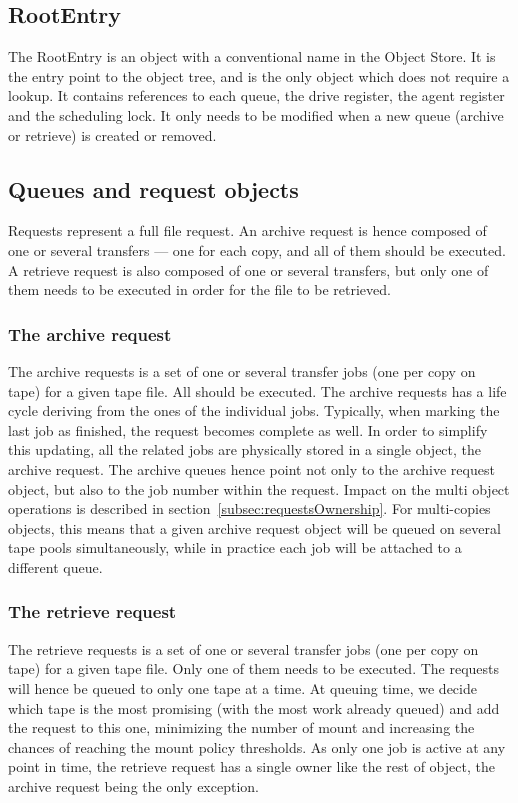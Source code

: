 \subsection{RootEntry}
The RootEntry is an object with a conventional name in the Object Store. It is the entry point to the object tree, and is the only object which does not require a lookup. It contains references to each queue, the drive register, the agent register and the scheduling lock. It only needs to be modified when a new queue (archive or retrieve) is created or removed.

\subsection{Queues and request objects}
Requests represent a full file request. An archive request is hence composed of one or several transfers --- one for each copy, and all of them should be executed. A retrieve request is also composed of one or several transfers, but only one of them needs to be executed in order for the file to be retrieved. 

\subsubsection{The archive request}
\label{subsec:archiveRequest}
The archive requests is a set of one or several transfer jobs (one per copy on tape) for a given tape file. All should be executed. The archive requests has a life cycle deriving from the ones of the individual jobs. Typically, when marking the last job as finished, the request becomes complete as well. In order to simplify this updating, all the related jobs are physically stored in a single object, the archive request. The archive queues hence point not only to the archive request object, but also to the job number within the request. Impact on the multi object operations is described in section~\ref{subsec:requestsOwnership}. For multi-copies objects, this means that a given archive request object will be queued on several tape pools simultaneously, while in practice each job will be attached to a different queue.

\subsubsection{The retrieve request}
The retrieve requests is a set of one or several transfer jobs (one per copy on tape) for a given tape file. Only one of them needs to be executed. The requests will hence be queued to only one tape at a time. At queuing time, we decide which tape is the most promising (with the most work already queued) and add the request to this one, minimizing the number of mount and increasing the chances of reaching the mount policy thresholds. As only one job is active at any point in time, the retrieve request has a single owner like the rest of object, the archive request being the only exception.

